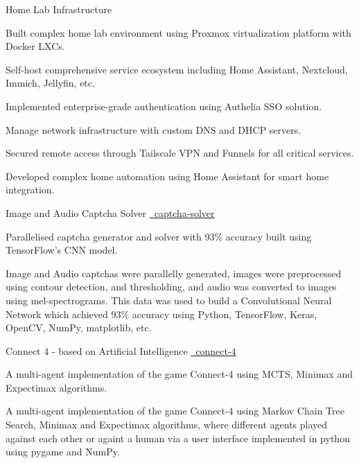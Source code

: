 \begin{cventries}
   \cvproject
     {Home Lab Infrastructure}
     {{}}
     {}
     {
        \begin{cvitems}
        \vspace{-0.5ex}
        \item {Built complex home lab environment using Proxmox virtualization platform with Docker LXCs.}
        \item {Self-host comprehensive service ecosystem including Home Assistant, Nextcloud, Immich, Jellyfin, etc.}
        \item {Implemented enterprise-grade authentication using Authelia SSO solution.}
        \item {Manage network infrastructure with custom DNS and DHCP servers.}
        \item {Secured remote access through Tailscale VPN and Funnels for all critical services.}
        \item {Developed complex home automation using Home Assistant for smart home integration.}
        \end{cvitems}
     }
     
   \cvproject
    {Image and Audio Captcha Solver}
    {
    {}
    {\href{https://github.com/mukeshmk/image-audio-captcha}
    {\faGithubSquare\ captcha-solver}}
    }
    {}
    {
      \begin{cvitems}
      \vspace{-0.5ex}
        {
        \item {Parallelised captcha generator and solver with 93\% accuracy built using TensorFlow’s CNN model.}
        }
        {
        Image and Audio captchas were parallelly generated, images were preprocessed using contour detection, and thresholding, and audio was converted to images using mel-spectrograms. This data was used to build a Convolutional Neural Network which achieved 93\% accuracy using Python, TensorFlow, Keras, OpenCV, NumPy, matplotlib, etc.
        }
      \end{cvitems}
    }
  \cvproject
    {Connect 4 - based on Artificial Intelligence}
    {
    {}
    {\href{https://github.com/mukeshmk/connect-4}{\faGithubSquare\ connect-4}}
    }
    {}
    {
      \begin{cvitems}
      \vspace{-0.5ex}
      {
      \item {A multi-agent implementation of the game Connect-4 using MCTS, Minimax and Expectimax algorithms.} 
      }
      {
      A multi-agent implementation of the game Connect-4 using Markov Chain Tree Search, Minimax and Expectimax algorithms, where different agents played against each other or againt a human via a user interface implemented in python using pygame and NumPy.
      }
      \end{cvitems}
    }
\end{cventries}
